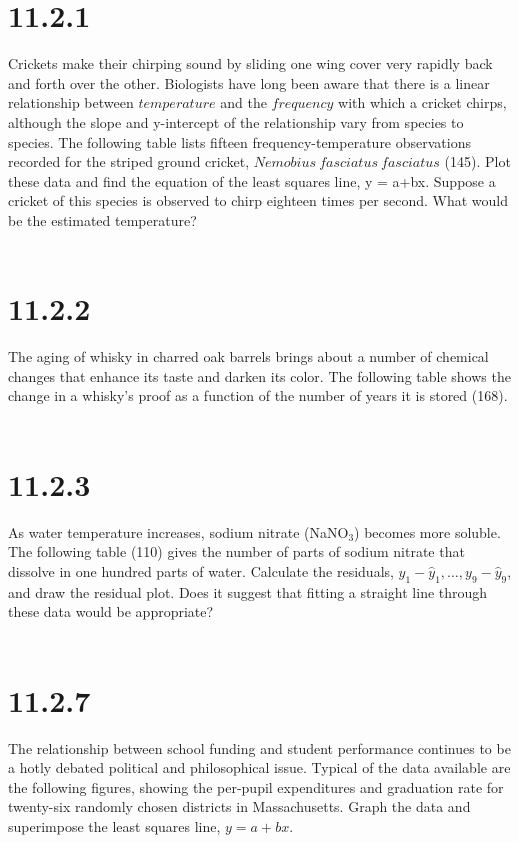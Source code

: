 \documentclass{article}
\begin{document}
\thispagestyle{firstpageheader}
{\Large 

\section*{11.2.1}
Crickets make their chirping sound by sliding one wing cover very rapidly back and forth over the other. Biologists have long been aware that there is a linear relationship between \(temperature\) and the \(frequency\) with which a cricket chirps, although the slope and y-intercept of the relationship vary from species to species. The following table lists fifteen frequency-temperature observations recorded for the striped ground cricket, \(Nemobius ~ fasciatus ~ fasciatus\) (145). Plot these data and find the equation of the least squares line, y = a+bx. Suppose a cricket of this species is observed to chirp eighteen times per second. What would be the estimated temperature?
\\
\\


\section*{11.2.2}
The aging of whisky in charred oak barrels brings about a number of chemical changes that enhance its taste and darken its color. The following table shows the change in a whisky's proof as a function of the number of years it is stored (168).
\\
\\


\section*{11.2.3}
As water temperature increases, sodium nitrate (NaN\(\text{O}_3\)) becomes more soluble. The following table (110) gives the number of parts of sodium nitrate that dissolve in one hundred parts of water. Calculate the residuals, \(y_1 - \hat{y}_1, \dots, y_9 - \hat{y}_9\), and draw the residual plot. Does it suggest that fitting a straight line through these data would be appropriate?
\\
\\


\section*{11.2.7}
The relationship between school funding and student performance continues to be a hotly debated political and philosophical issue. Typical of the data available are the following figures, showing the per-pupil expenditures and graduation rate for twenty-six randomly chosen districts in Massachusetts. Graph the data and superimpose the least squares line, \(y = a + bx\).


}
\end{document}
